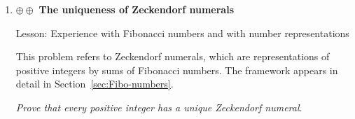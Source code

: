 \begin{enumerate}
{\sc Lesson:} Enhance understanding of the two main ways of representing rational numbers

\smallskip

It is well-known that the decimal expansion of Euler's constant $e$ is infinite and non-periodic and that it begins
\[ e = 2.718281828 \cdots \]  
Therefore, Proposition~\ref{thm:rational-real} assures us that the infinite ultimately periodic decimal expansion (with added spaces to highlight the periodicity)
\[ 2.7 \ 1828 \ 1828 \ 1828 \ \cdots \ 1828 \ 1828 \ \cdots   \]
represents a rational number $r$ which agrees with $e$ for ten decimal places.

\smallskip

{\em Find a representation of $r$ as a fraction.  In more detail, find positive integers $p$ and $q$ such that}
\[ {p \over q} \ = \ r \ = \ 2.7 \ 1828 \ 1828 \ 1828 \ \cdots \ 1828 \ 1828 \ \cdots   \]


\medskip\item
$\oplus \oplus$ {\bf The uniqueness of Zeckendorf numerals}

{\sc Lesson:} Experience with Fibonacci numbers and with number representations

\smallskip

This problem refers to Zeckendorf numerals, which are representations of positive integers by sums of Fibonacci numbers.  The framework appears in detail in Section~\ref{sec:Fibo-numbers}.

\smallskip

{\em Prove that every positive integer has a unique Zeckendorf numeral}.

\end{enumerate}
